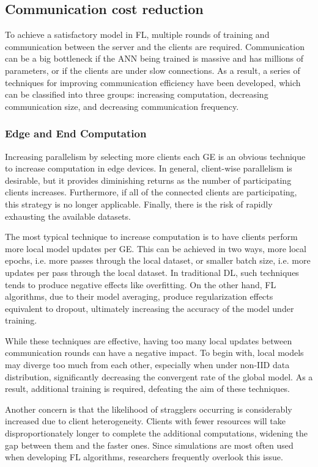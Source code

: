 \subsection{Communication cost reduction}
To achieve a satisfactory model in FL, multiple rounds of training and communication between the server and the clients are required. Communication can be a big bottleneck if the ANN being trained is massive and has millions of parameters, or if the clients are under slow connections. As a result, a series of techniques for improving communication efficiency have been developed, which can be classified into three groups: increasing computation, decreasing communication size, and decreasing communication frequency.

\subsubsection{Edge and End Computation}
Increasing parallelism by selecting more clients each GE is an obvious technique to increase computation in edge devices. In general, client-wise parallelism is desirable, but it provides diminishing returns as the number of participating clients increases. Furthermore, if all of the connected clients are participating, this strategy is no longer applicable. Finally, there is the risk of rapidly exhausting the available datasets.

The most typical technique to increase computation is to have clients perform more local model updates per GE. This can be achieved in two ways, more local epochs, i.e. more passes through the local dataset, or smaller batch size, i.e. more updates per pass through the local dataset. In traditional DL, such techniques tends to produce negative effects like overfitting. On the other hand, FL algorithms, due to their model averaging, produce regularization effects equivalent to dropout, ultimately increasing the accuracy of the model under training.

While these techniques are effective, having too many local updates between communication rounds can have a negative impact. To begin with, local models may diverge too much from each other, especially when under non-IID data distribution, significantly decreasing the convergent rate of the global model. As a result, additional training is required, defeating the aim of these techniques.

Another concern is that the likelihood of stragglers occurring is considerably increased due to client heterogeneity. Clients with fewer resources will take disproportionately longer to complete the additional computations, widening the gap between them and the faster ones. Since simulations are most often used when developing FL algorithms, researchers frequently overlook this issue.

